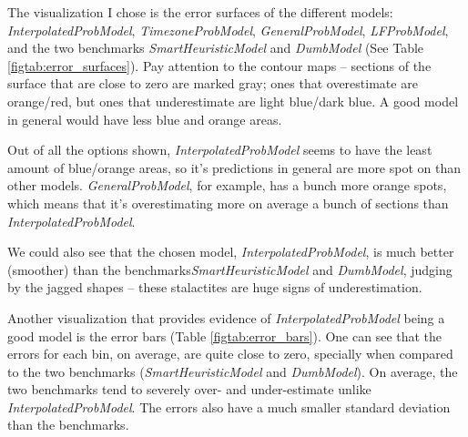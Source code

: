\documentclass[oneside]{article}
\begin{document}
The visualization I chose is the error surfaces of the different models:
\emph{InterpolatedProbModel}, \emph{TimezoneProbModel},
\emph{GeneralProbModel}, \emph{LFProbModel}, and the two benchmarks
\emph{SmartHeuristicModel} and \emph{DumbModel} (See Table
\ref{figtab:error_surfaces}). Pay attention to the contour maps -- sections of
the surface that are close to zero are marked gray; ones that overestimate are
orange/red, but ones that underestimate are light blue/dark blue. A good model
in general would have less blue and orange areas.

Out of all the options shown, \emph{InterpolatedProbModel} seems to have the
least amount of blue/orange areas, so it's predictions in general are more spot
on than other models. \emph{GeneralProbModel}, for example, has a bunch more
orange spots, which means that it's overestimating more on average a bunch of
sections than \emph{InterpolatedProbModel}.

We could also see that the chosen model, \emph{InterpolatedProbModel}, is much
better (smoother) than the benchmarks\emph{SmartHeuristicModel} and
\emph{DumbModel}, judging by the jagged shapes -- these stalactites are huge
signs of underestimation.

Another visualization that provides evidence of \emph{InterpolatedProbModel}
being a good model is the error bars (Table \ref{figtab:error_bars}). One can
see that the errors for each bin, on average, are quite close to zero,
specially when compared to the two benchmarks (\emph{SmartHeuristicModel} and
\emph{DumbModel}). On average, the two benchmarks tend to severely over- and
under-estimate unlike \emph{InterpolatedProbModel}. The errors also have a much
smaller standard deviation than the benchmarks.
\end{document}
